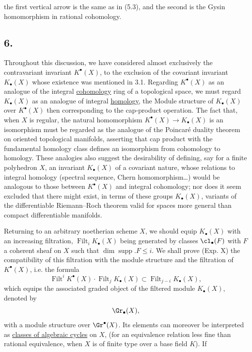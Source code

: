 the first vertical arrow is the same as in (5.3), and the second is the Gysin homomorphism in rational cohomology.

\subsection*{6.}
Throughout this discussion, we have considered almost exclusively the contravariant invariant $K^\bullet(X)$, to the exclusion of the covariant invariant $K_\bullet(X)$ whose existence was mentioned in 3.1. Regarding $K^\bullet(X)$ as an analogue of the integral \underline{cohomology} ring of a topological space, we must regard $K_\bullet(X)$ as an analogue of integral \underline{homology}, the Module structure of $K_\bullet(X)$ over $K^\bullet(X)$ then corresponding to the cap-product operation. The fact that, when $X$ is regular, the natural homomorphism $K^\bullet(X)\to K_\bullet(X)$ is an isomorphism must be regarded as the analogue of the Poincaré duality theorem on oriented topological manifolds, asserting that cap product with the fundamental homology class defines an isomorphism from cohomology to homology. These analogies also suggest the desirability of defining, say for a finite polyhedron $X$, an invariant $K_\bullet(X)$ of a covariant nature, whose relations to integral homology (spectral sequence, Chern homomorphism\dots) would be analogous to those between $K^\bullet(X)$ and integral cohomology; nor does it seem excluded that there might exist, in terms of these groups $K_\bullet(X)$, variants of the differentiable Riemann--Roch theorem valid for spaces more general than compact differentiable manifolds.

Returning to an arbitrary noetherian scheme $X$, we should equip $K_\bullet(X)$ with an increasing filtration, $\operatorname{Filt}_iK_\bullet(X)$ being generated by classes $\cl_\bullet(F)$ with $F$ a coherent sheaf on $X$ such that $\dim \operatorname{supp}.F\le i$. We shall prove (Exp. X) the compatibility of this filtration with the module structure and the filtration of $K^\bullet(X)$, i.e. the formula
\begin{equation}\tag{6.1}
\operatorname{Filt}^iK^\bullet(X)\cdot \operatorname{Filt}_j K_\bullet(X)\subset \operatorname{Filt}_{j-i}K_\bullet(X),
\end{equation}
which equips the associated graded object of the filtered module $K_\bullet(X)$, denoted by
\[
\Gr_\bullet(X),
\]
with a module structure over $\Gr^\bullet(X)$. Its elements can moreover be interpreted as \uline{classes of algebraic cycles} on $X$, (for an equivalence relation less fine than rational equivalence, when $X$ is of finite type over a base field $K$). If

